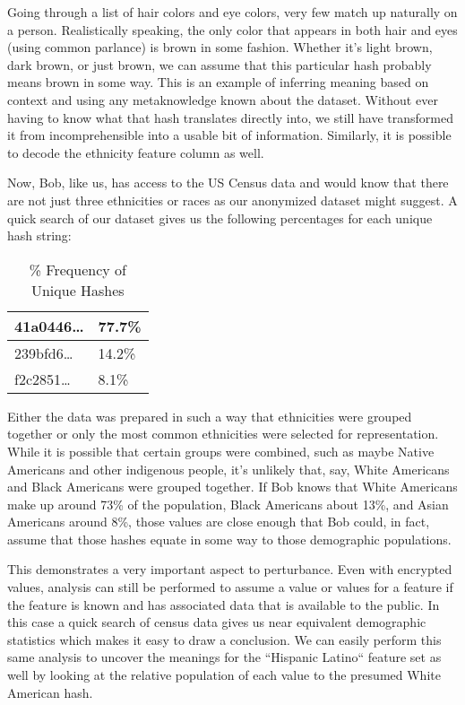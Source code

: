 \documentclass[10pt,journal,compsoc]{IEEEtran}
\begin{document}
Going through a list of hair colors and eye colors, very few match up naturally on a person. Realistically speaking, the only color that appears in both hair and eyes (using common parlance) is brown in some fashion. Whether it's light brown, dark brown, or just brown, we can assume that this particular hash probably means brown in some way. This is an example of inferring meaning based on context and using any metaknowledge known about the dataset. Without ever having to know what that hash translates directly into, we still have transformed it from incomprehensible into a usable bit of information. Similarly, it is possible to decode the ethnicity feature column as well.

Now, Bob, like us, has access to the US Census data and would know that there are not just three ethnicities or races as our anonymized dataset might suggest. A quick search of our dataset gives us the following percentages for each unique hash string:


\begin{table} [ht]
\caption{\% Frequency of Unique Hashes}
\begin{center}

\begin{tabular}{|l|l|}
\hline
41a0446… & 77.7\% \\
\hline
239bfd6… & 14.2\%\\
\hline
f2c2851… & 8.1\%\\

\hline

\end{tabular}
\end{center}
\end{table}


Either the data was prepared in such a way that ethnicities were grouped together or only the most common ethnicities were selected for representation. While it is possible that certain groups were combined, such as maybe Native Americans and other indigenous people, it's unlikely that, say, White Americans and Black Americans were grouped together. If Bob knows that White Americans make up around 73\% of the population, Black Americans about 13\%, and Asian Americans around 8\%, those values are close enough that Bob could, in fact, assume that those hashes equate in some way to those demographic populations.

This demonstrates a very important aspect to perturbance. Even with encrypted values, analysis can still be performed to assume a value or values for a feature if the feature is known and has associated data that is available to the public. In this case a quick search of census data gives us near equivalent demographic statistics which makes it easy to draw a conclusion. We can easily perform this same analysis to uncover the meanings for the ``Hispanic Latino`` feature set as well by looking at the relative population of each value to the presumed White American hash.
\end{document}
